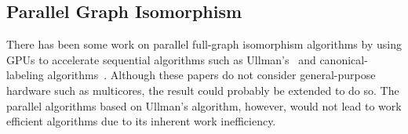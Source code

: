



\subsection{Parallel Graph Isomorphism}
There has been some work on parallel full-graph isomorphism algorithms
by using GPUs to accelerate sequential algorithms such as
Ullman's~\cite{ullman} and canonical-labeling
algorithms~\cite{gpuiso,gpu-canon-forms}.
%
Although these papers do not consider general-purpose hardware such as
multicores, the result could probably be extended to do so.
%
The parallel algorithms based on Ullman's algorithm, however, would
not lead to work efficient algorithms due to its inherent work
inefficiency.


